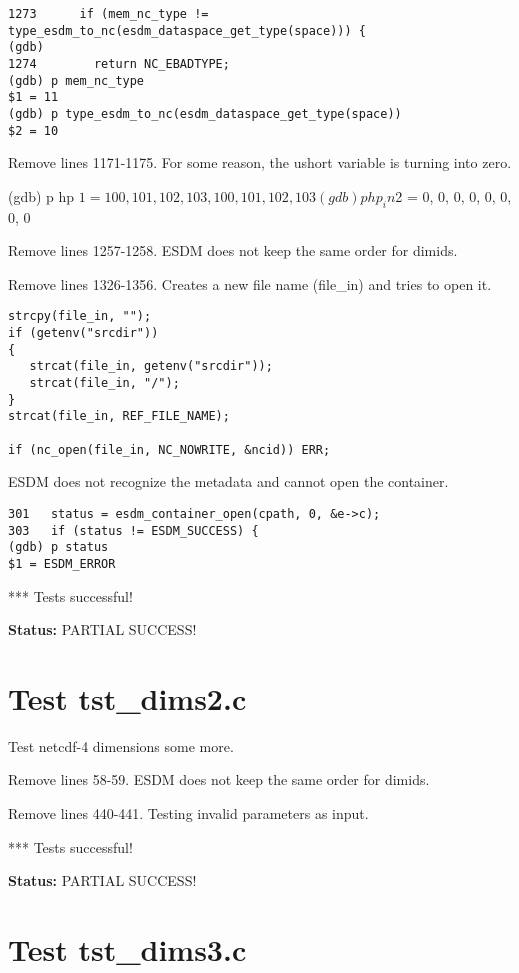 \begin{verbatim}
1273	  if (mem_nc_type != type_esdm_to_nc(esdm_dataspace_get_type(space))) {
(gdb)
1274	    return NC_EBADTYPE;
(gdb) p mem_nc_type
$1 = 11
(gdb) p type_esdm_to_nc(esdm_dataspace_get_type(space))
$2 = 10
\end{verbatim}

Remove lines 1171-1175. For some reason, the ushort variable is turning into zero.

(gdb) p hp
$1 = {{{100, 101, 102, 103}, {100, 101, 102, 103}}}
(gdb) p hp_in
$2 = {{{0, 0, 0, 0}, {0, 0, 0, 0}}}

Remove lines 1257-1258. ESDM does not keep the same order for dimids.

Remove lines 1326-1356. Creates a new file name (file\_in) and tries to open it.

\begin{verbatim}
strcpy(file_in, "");
if (getenv("srcdir"))
{
   strcat(file_in, getenv("srcdir"));
   strcat(file_in, "/");
}
strcat(file_in, REF_FILE_NAME);

if (nc_open(file_in, NC_NOWRITE, &ncid)) ERR;
\end{verbatim}

ESDM does not recognize the metadata and cannot open the container.

\begin{verbatim}
301	  status = esdm_container_open(cpath, 0, &e->c);
303	  if (status != ESDM_SUCCESS) {
(gdb) p status
$1 = ESDM_ERROR
\end{verbatim}

*** Tests successful!

{\bf \large Status: } PARTIAL SUCCESS!

\section{Test tst\_dims2.c}

Test netcdf-4 dimensions some more.

Remove lines 58-59. ESDM does not keep the same order for dimids.

Remove lines 440-441. Testing invalid parameters as input.

*** Tests successful!

{\bf \large Status: } PARTIAL SUCCESS!

\section{Test tst\_dims3.c}

